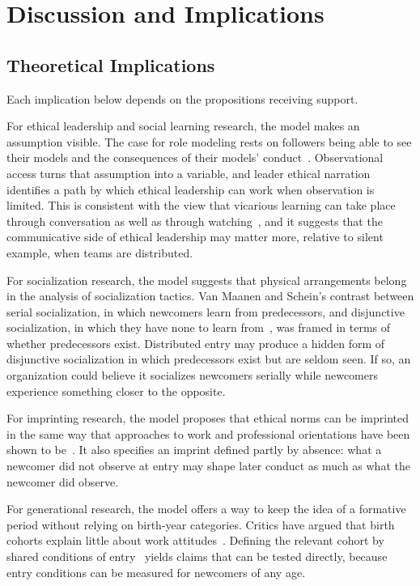 \section{Discussion and Implications}
\subsection{Theoretical Implications}

Each implication below depends on the propositions receiving support.

For ethical leadership and social learning research, the model makes an assumption visible. The case for role modeling rests on followers being able to see their models and the consequences of their models' conduct~\citep{brown2005ethical,brown2006ethical}. Observational access turns that assumption into a variable, and leader ethical narration identifies a path by which ethical leadership can work when observation is limited. This is consistent with the view that vicarious learning can take place through conversation as well as through watching~\citep{myers2018coactive}, and it suggests that the communicative side of ethical leadership may matter more, relative to silent example, when teams are distributed.

For socialization research, the model suggests that physical arrangements belong in the analysis of socialization tactics. Van Maanen and Schein's contrast between serial socialization, in which newcomers learn from predecessors, and disjunctive socialization, in which they have none to learn from~\citep{vanmaanen1979toward}, was framed in terms of whether predecessors exist. Distributed entry may produce a hidden form of disjunctive socialization in which predecessors exist but are seldom seen. If so, an organization could believe it socializes newcomers serially while newcomers experience something closer to the opposite.

For imprinting research, the model proposes that ethical norms can be imprinted in the same way that approaches to work and professional orientations have been shown to be~\citep{tilcsik2014imprint,azoulay2017social}. It also specifies an imprint defined partly by absence: what a newcomer did not observe at entry may shape later conduct as much as what the newcomer did observe.

For generational research, the model offers a way to keep the idea of a formative period without relying on birth-year categories. Critics have argued that birth cohorts explain little about work attitudes~\citep{costanza2015generationally,rudolph2017considering}. Defining the relevant cohort by shared conditions of entry~\citep{joshi2010unpacking} yields claims that can be tested directly, because entry conditions can be measured for newcomers of any age.

